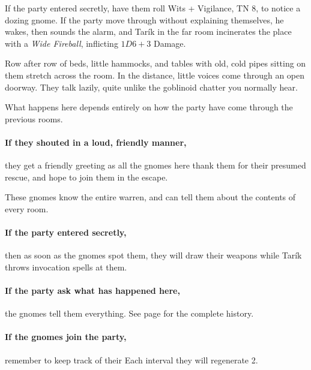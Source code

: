 \begin{multicols}{2}

If the party entered secretly, have them roll Wits + Vigilance, TN 8, to notice a dozing gnome.
If the party move through without explaining themselves, he wakes, then sounds the alarm, and Tar\'ik in the far room incinerates the place with a \textit{Wide Fireball}, inflicting $1D6 +3$ Damage.

\begin{boxtext}

  Row after row of beds, little hammocks, and tables with old, cold pipes sitting on them stretch across the room.
  In the distance, little voices come through an open doorway.
  They talk lazily, quite unlike the goblinoid chatter you normally hear.

\end{boxtext}


What happens here depends entirely on how the party have come through the previous rooms.

\paragraph{If they shouted in a loud, friendly manner,}
they get a friendly greeting as all the gnomes here thank them for their presumed rescue, and hope to join them in the escape.

These gnomes know the entire warren, and can tell them about the contents of every room.

\paragraph{If the party entered secretly,}
then as soon as the gnomes spot them, they will draw their weapons while Tar\'ik throws invocation spells at them.

\paragraph{If the party ask what has happened here,}
the gnomes tell them everything.
See page \pageref{invasionhistory} for the complete history.

\paragraph{If the gnomes join the party,}
remember to keep track of their 
Each \gls{interval} they will regenerate 2.


\end{multicols}
